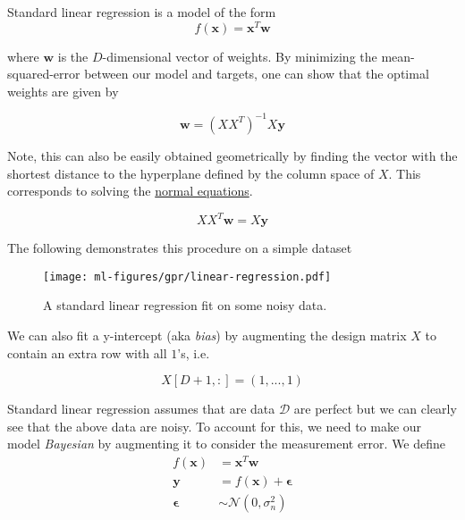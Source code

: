 Standard linear regression is a model of the form
\begin{equation}
  f(\mathbf{x}) = \mathbf{x}^T\mathbf{w}
\end{equation}

where $\mathbf{w}$ is the $D$-dimensional vector of weights. By minimizing the mean-squared-error between our model and targets, one can show that the optimal weights are given by

\begin{equation}
  \mathbf{w} = (XX^T)^{-1}X\mathbf{y}
\end{equation}


Note, this can also be easily obtained geometrically by finding the vector with the shortest distance to the hyperplane defined by the column space of $X$. This corresponds to solving the \href{https://en.wikipedia.org/wiki/Ordinary_least_squares#Normal_equations}{normal equations}.

\begin{equation}
  XX^T \mathbf{w} = X\mathbf{y}
\end{equation}

The following demonstrates this procedure on a simple dataset

\begin{figure}[h]
  \begin{centering}
    \texttt{[image: ml-figures/gpr/linear-regression.pdf]}
  \end{centering}
  \caption{A standard linear regression fit on some noisy data.}
\end{figure}

We can also fit a y-intercept (aka \textit{bias}) by augmenting the design matrix $X$ to contain an extra row with all $1$'s, i.e.

\begin{equation}
  X[D+1, :] = (1, ..., 1)
\end{equation}

Standard linear regression assumes that are data $\mathcal{D}$ are perfect but we can clearly see that the above data are noisy. To account for this, we need to make our model \textit{Bayesian} by augmenting it to consider the measurement error. We define
\begin{align}
    f(\mathbf{x}) &= \mathbf{x}^T\mathbf{w} \\
    \mathbf{y} &= f(\mathbf{x}) + \mathbf{\epsilon} \\
    \mathbf{\epsilon} &\sim \mathcal{N}(0, \sigma_n^2)
\end{align}

